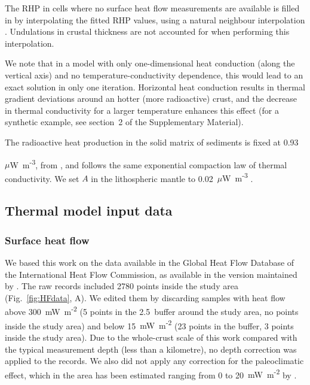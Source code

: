 The RHP in cells where no surface heat flow measurements are available is filled in by interpolating the fitted RHP values, using a natural neighbour interpolation \parencite{Sibson1981}.
Undulations in crustal thickness are not accounted for when performing this interpolation.

We note that in a model with only one-dimensional heat conduction (along the vertical axis) and no temperature-conductivity dependence, this would lead to an exact solution in only one iteration.
Horizontal heat conduction results in thermal gradient deviations around an hotter (more radioactive) crust, and the decrease in thermal conductivity for a larger temperature enhances this effect (for a synthetic example, see section~2 of the Supplementary Material).

The radioactive heat production in the solid matrix of sediments is fixed at 0.93~{$\mu$W~m\textsuperscript{-3}, from \textcite{Vila2010}, and follows the same exponential compaction law of thermal conductivity.
We set $A$ in the lithospheric mantle to 0.02~{$\mu$W~m\textsuperscript{-3}} \parencite{Hasterok2011cont}.

\subsection{Thermal model input data}
\label{ss:Appl:ThermInput}

\subsubsection{Surface heat flow}
\label{sss:ThermInputSHF}

We based this work on the data available in the Global Heat Flow Database of the International Heat Flow Commission, as available in the version maintained by \textcite{globalHF}.
The raw records included 2780 points inside the study area (Fig.~\ref{fig:HFdata}, A).
We edited them by discarding samples with heat flow above 300~{mW~m\textsuperscript{-2}} (5 points in the 2.5\textdegree~buffer around the study area, no points inside the study area) and below 15~{mW~m\textsuperscript{-2}} (23 points in the buffer, 3 points inside the study area).
Due to the whole-crust scale of this work compared with the typical measurement depth (less than a kilometre), no depth correction was applied to the records.
We also did not apply any correction for the paleoclimatic effect, which in the area has been estimated ranging from 0 to 20~{mW~m\textsuperscript{-2}} by \textcite{Majorowicz2011}.

}

